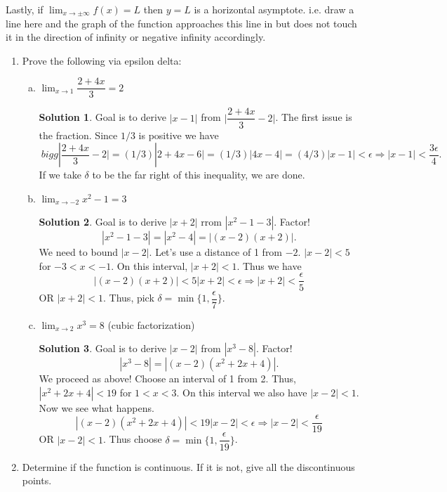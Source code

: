 \documentclass[10pt]{article}
\newcommand{\ds}{\displaystyle}
\theoremstyle{Theorem}
\theoremstyle{definition}
\newtheorem*{solution}{Solution}
\theoremstyle{remark}
\theoremstyle{custom}
\begin{document}
Lastly, if $\ds\lim_{x\rightarrow\pm\infty} f(x)=L$ then $y=L$ is a horizontal asymptote. i.e. draw a line here and the graph of the function approaches this line in but does not touch it in the direction of infinity or negative infinity accordingly. 
\newpage
\begin{enumerate}[1.]
\item Prove the following via epsilon delta:
\begin{enumerate}[a.]
\item $\ds\lim_{x\rightarrow1}\dfrac{2+4x}{3}=2$
\begin{solution}
Goal is to derive $|x-1|$ from $\bigg |\dfrac{2+4x}{3}-2\bigg|$. The first issue is the fraction. Since $1/3$ is positive we have
\[\
bigg |\dfrac{2+4x}{3}-2\bigg|=(1/3)|2+4x-6|=(1/3)|4x-4|=(4/3)|x-1|<\epsilon \Rightarrow |x-1|<\dfrac{3\epsilon }{4}.
\]
If we take $\delta$ to be the far right of this inequality, we are done.
\end{solution}
\item $\ds\lim_{x\rightarrow-2}x^2-1=3$
\begin{solution}
Goal is to derive $|x+2|$ rrom $|x^2-1-3|$. Factor!
\[
|x^2-1-3|=|x^2-4|=|(x-2)(x+2)|.
\]
We need to bound $|x-2|$. Let's use a distance of 1 from $-2$. $|x-2|< 5$ for $-3< x< -1$. On this interval, $|x+2|<1$. Thus we have 
\[|(x-2)(x+2)|<5|x+2|<\epsilon \Rightarrow |x+2|<\dfrac{\epsilon}{5}
\]
OR $|x+2|<1$. Thus, pick $\delta=\min\{1,\dfrac{\epsilon}{7}\}$.
\end{solution}
\item $\ds\lim_{x\rightarrow2}x^3=8$ (cubic factorization)
\begin{solution}
Goal is to derive $|x-2|$ from $|x^3-8|$. Factor!
\[
|x^3-8|=|(x-2)(x^2+2x +4)|.
\]
We proceed as above! Choose an interval of 1 from 2. Thus, $|x^2+2x+4|<19$ for $1<x<3$. On this interval we also have $|x-2|<1$.  Now we see what happens.
\[
|(x-2)(x^2+2x+4)|<19|x-2|<\epsilon \Rightarrow |x-2|<\dfrac{\epsilon}{19}
\]
OR $|x-2|<1$. Thus choose $\delta=\min \{1,\dfrac{\epsilon}{19} \}$.
\end{solution}
\end{enumerate}
\item Determine if the function is continuous. If it is not, give all the discontinuous points.
\begin{enumerate}[a.]
\item $\begin{cases} 
      x+1 & x\leq 1 \\
      \dfrac{1}{x} & 1< x< 3 \\

\end{cases}
\end{enumerate}
\end{enumerate}
\end{document}
